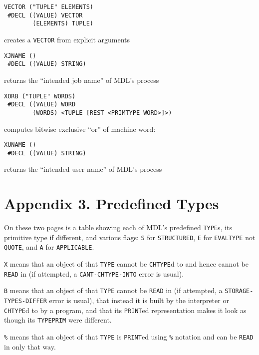 \documentclass[a4paper,]{article}
\begin{document}
\begin{verbatim}
VECTOR ("TUPLE" ELEMENTS)
 #DECL ((VALUE) VECTOR
        (ELEMENTS) TUPLE)
\end{verbatim}

creates a \texttt{VECTOR} from explicit arguments

\begin{verbatim}
XJNAME ()
 #DECL ((VALUE) STRING)
\end{verbatim}

returns the ``intended job name'' of MDL's process

\begin{verbatim}
XORB ("TUPLE" WORDS)
 #DECL ((VALUE) WORD
        (WORDS) <TUPLE [REST <PRIMTYPE WORD>]>)
\end{verbatim}

computes bitwise exclusive ``or'' of machine word:

\begin{verbatim}
XUNAME ()
 #DECL ((VALUE) STRING)
\end{verbatim}

returns the ``intended user name'' of MDL's process

\section{Appendix 3. Predefined Types}\label{appendix-3.-predefined-types}

On these two pages is a table showing each of MDL's predefined \texttt{TYPE}s, its primitive type if different, and various
flags: \texttt{S} for \texttt{STRUCTURED}, \texttt{E} for \texttt{EVALTYPE} not \texttt{QUOTE}, and \texttt{A} for
\texttt{APPLICABLE}.

\texttt{X} means that an object of that \texttt{TYPE} cannot be \texttt{CHTYPE}d to and hence cannot be \texttt{READ} in
(if attempted, a \texttt{CAN\textquotesingle{}T-CHTYPE-INTO} error is usual).

\texttt{B} means that an object of that \texttt{TYPE} cannot be \texttt{READ} in (if attempted, a
\texttt{STORAGE-TYPES-DIFFER} error is usual), that instead it is built by the interpreter or \texttt{CHTYPE}d to by a
program, and that its \texttt{PRINT}ed representation makes it look as though its \texttt{TYPEPRIM} were different.

\texttt{\%} means that an object of that \texttt{TYPE} is \texttt{PRINT}ed using \texttt{\%} notation and can be
\texttt{READ} in only that way.
\end{document}

